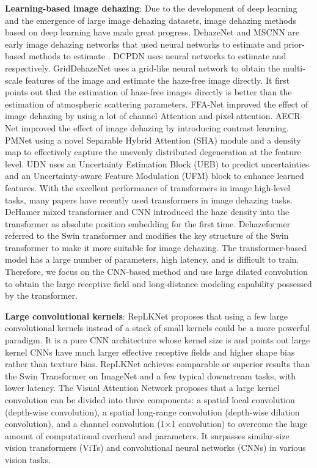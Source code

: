 \documentclass[10pt,twocolumn,letterpaper]{article}
\begin{document}
{\bfseries Learning-based image dehazing}: Due to the development of deep learning and the emergence of large image dehazing datasets, image dehazing methods based on deep learning have made great progress. DehazeNet \cite{Dehazenet} and MSCNN \cite{MSCNN} are early image dehazing networks that used neural networks to estimate  and prior-based methods to estimate . DCPDN \cite{DCPDN} uses neural networks to estimate  and  respectively. GridDehazeNet \cite{Griddehazenet} uses a grid-like neural network to obtain the multi-scale features of the image and estimate the haze-free image directly. It first points out that the estimation of haze-free images directly is better than the estimation of atmospheric scattering parameters. FFA-Net \cite{qin2020ffa} improved the effect of image dehazing by using a lot of channel Attention and pixel attention. AECR-Net\cite{AECR-net} improved the effect of image dehazing by introducing contrast learning. PMNet\cite{PMNet} using a novel Separable Hybrid Attention (SHA) module and a density map to effectively capture the unevenly distributed degeneration at the feature level. UDN\cite{UDN} uses an Uncertainty Estimation Block (UEB) to predict uncertainties and an Uncertainty-aware Feature Modulation (UFM) block to enhance learned features. With the excellent performance of transformers in image high-level tasks, many papers have recently used transformers in image dehazing tasks. DeHamer \cite{Dehamer} mixed transformer and CNN introduced the haze density into the transformer as absolute position embedding for the first time. Dehazeformer \cite{song2022vision} referred to the Swin transformer and modifies the key structure of the Swin transformer to make it more suitable for image dehazing. The transformer-based model has a large number of parameters, high latency, and is difficult to train. Therefore, we focus on the CNN-based method and use large dilated convolution to obtain the large receptive field and long-distance modeling capability possessed by the transformer. 

{\bfseries Large convolutional kernels}: RepLKNet \cite{largeKernel} proposes that using a few large convolutional kernels instead of a stack of small kernels could be a more powerful paradigm. It is a pure CNN architecture whose kernel size is  and points out large kernel CNNs have much larger effective receptive fields and higher shape bias rather than texture bias. RepLKNet \cite{largeKernel} achieves comparable or superior results than the Swin Transformer on ImageNet and a few typical downstream tasks, with lower latency. The Visual Attention Network \cite{VAN} proposes that a large kernel convolution can be divided into three components: a spatial local convolution (depth-wise convolution), a spatial long-range convolution (depth-wise dilation convolution), and a channel convolution (1×1 convolution) to overcome the huge amount of computational overhead and parameters. It surpasses similar-size vision transformers (ViTs) and convolutional neural networks (CNNs) in various vision tasks.     
\end{document}
